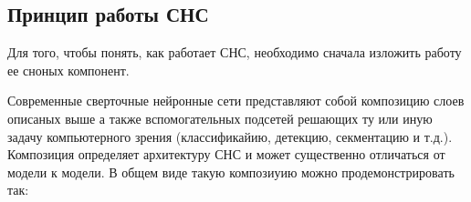 \subsection{Принцип работы СНС}

Для того, чтобы понять, как работает СНС, необходимо сначала изложить работу ее сноных компонент.





Современные сверточные нейронные сети представляют собой композицию слоев описаных выше а также вспомогательных подсетей решающих ту или иную задачу компьютерного зрения (классификайию, детекцию, секментацию и т.д.). Композиция определяет архитектуру СНС и может существенно отличаться от модели к модели. В общем виде такую композиуию можно продемонстрировать так:

